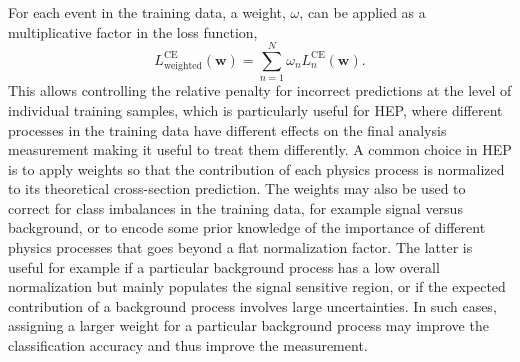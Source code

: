 For each event in the training data, a weight, $\omega$, can be applied as a multiplicative factor in the loss function, 
\begin{equation}
    L_{\text{weighted}}^{\text{CE}}(\pmb{w}) = \sum _{n=1}^{N} \omega_n L_n^{\text{CE}}(\pmb{w}).
\end{equation}
This allows controlling the relative penalty for incorrect predictions at the level of individual training samples, which is particularly useful for HEP, where different processes in the training data have different effects on the final analysis measurement making it useful to treat them differently.
A common choice in HEP is to apply weights so that the contribution of each physics process is normalized to its theoretical cross-section prediction.
The weights may also be used to correct for class imbalances in the training data, for example signal versus background, or to encode some prior knowledge of the importance of different physics processes that goes beyond a flat normalization factor. The latter is useful for example if a particular background process has a low overall normalization but mainly populates the signal sensitive region, or if the expected contribution of a background process involves large uncertainties.
In such cases, assigning a larger weight for a particular background process may improve the classification accuracy and thus improve the measurement.

